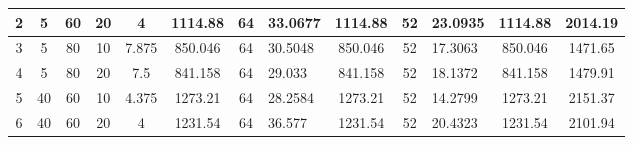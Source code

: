 \documentclass[12pt, a4paper]{article}
\begin{document}
\begin{table}[H]
\begin{tabular}{|c|c|c|c|c|c|c|l|c|c|l|c|c|}
		2                 & 5                         & 60                         & 20                         & 4                    & 1114.88  & 64                                                                      & 33.0677                                                & 1114.88  & 52                                                                      & 23.0935                                                & 1114.88                        & 2014.19                        \\ \hline
		3                 & 5                         & 80                         & 10                         & 7.875                & 850.046  & 64                                                                      & 30.5048                                                & 850.046  & 52                                                                      & 17.3063                                                & 850.046                        & 1471.65                        \\ \hline
		4                 & 5                         & 80                         & 20                         & 7.5                  & 841.158  & 64                                                                      & 29.033                                                 & 841.158  & 52                                                                      & 18.1372                                                & 841.158                        & 1479.91                        \\ \hline
		5                 & 40                        & 60                         & 10                         & 4.375                & 1273.21  & 64                                                                      & 28.2584                                                & 1273.21  & 52                                                                      & 14.2799                                                & 1273.21                        & 2151.37                        \\ \hline
		6                 & 40                        & 60                         & 20                         & 4                    & 1231.54  & 64                                                                      & 36.577                                                 & 1231.54  & 52                                                                      & 20.4323                                                & 1231.54                        & 2101.94                        \\ \hline

\end{tabular}
\end{table}
\end{document}
